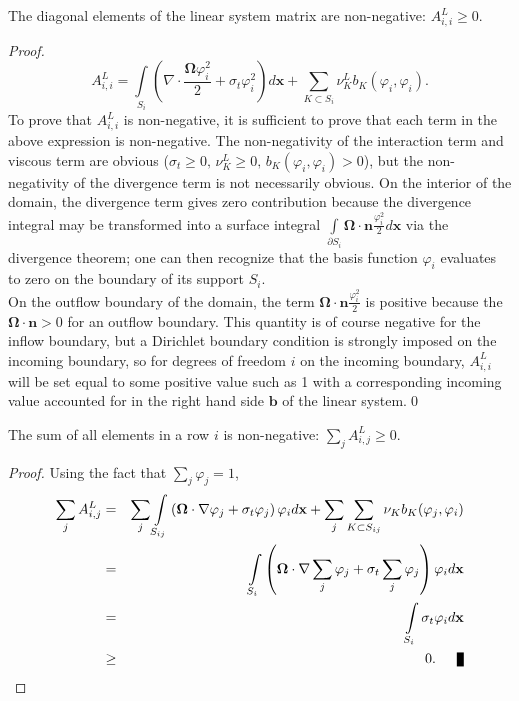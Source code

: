 \begin{lemma}\label{diagonalpositive}
   The diagonal elements  of the linear system matrix are non-negative: $A^L_{i,i}\ge 0$.
\end{lemma}
\begin{proof}
\[
	A^L_{i,i} = \int\limits_{S_{i}}\left(\nabla\cdot\frac{\mathbf{\Omega}\varphi_i^2}{2} +
		\sigma_t\varphi_i^2\right) d\mathbf{x} +
		\sum\limits_{K\subset S_{i}}\nu_K^L b_K(\varphi_i, \varphi_i).
\]
To prove that $A^L_{i,i}$ is non-negative, it is sufficient to prove that
each term in the above expression is non-negative. The non-negativity of
the interaction term and viscous term are obvious ($\sigma_t \ge 0, 
\, \nu_K^L\ge 0, \, b_K(\varphi_i, \varphi_i)>0$), but
the non-negativity of the divergence term is not necessarily obvious. On the interior of
the domain, the divergence term gives zero contribution because the divergence integral may
be transformed into a surface integral $\int\limits_{\partial S_{i}}
\mathbf{\Omega}\cdot\mathbf{n}\frac{\varphi_i^2}{2} d\mathbf{x}$
via the divergence theorem; one can then recognize that
the basis function $\varphi_i$ evaluates to zero on the boundary of its support $S_{i}$.\\
On the outflow boundary of the domain, the term $\mathbf{\Omega}\cdot\mathbf{n}
\frac{\varphi_i^2}{2}$ is positive because the $\mathbf{\Omega}\cdot\mathbf{n} >0$
for an outflow boundary. This quantity is of course negative for the inflow boundary,
but a Dirichlet boundary condition is strongly imposed on the incoming boundary, so
for degrees of freedom $i$ on the incoming boundary, $A^L_{i,i}$ will be set equal
to some positive value such as 1 with a corresponding incoming value
accounted for in the right hand side $\mathbf{b}$ of the linear system.\qed
\end{proof}

\newpage
\begin{lemma}
   The sum of all elements in a row $i$ is non-negative: $\sum\limits_j A^L_{i,j} \ge 0$.
\end{lemma}

\begin{proof}
Using the fact that $\sum\limits_j\varphi_j=1$,
\begin{eqnarray*}
	\sum\limits_j A^L_{i,j} & = & \sum\limits_j\int\limits_{S_{ij}}
      \left(\mathbf{\Omega}\cdot\nabla\varphi_j +
		\sigma_t\varphi_j\right)\varphi_i d\mathbf{x} +
		\sum\limits_j\sum\limits_{K\subset S_{ij}}\nu_K b_K(\varphi_j, \varphi_i)\\
		& = & \int\limits_{S_{i}}\left(\mathbf{\Omega}\cdot\nabla\sum\limits_j\varphi_j +
		\sigma_t\sum\limits_j\varphi_j\right)\varphi_i d\mathbf{x}\\
		& = & \int\limits_{S_{i}}\sigma_t\varphi_i d\mathbf{x}\\
		&\ge& 0.\qed
\end{eqnarray*}
\end{proof}

